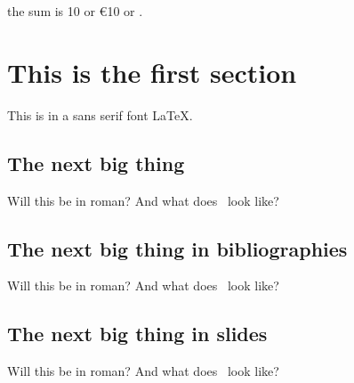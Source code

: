 \documentclass{article}
\begin{document}
the sum is \texteuro{}10 or \euro{10} or .
\rm

\section{This is the first section}

\sf This is in a sans serif font \LaTeX.

\subsection{The next big thing}

Will this be in roman?  And what does \LaTeXe\ look like?

\subsection{The next big thing in bibliographies}

Will this be in roman?  And what does \BibTeX\ look like?

\subsection{The next big thing in slides}

Will this be in roman?  And what does \SLiTeX\ look like?
\end{document}
